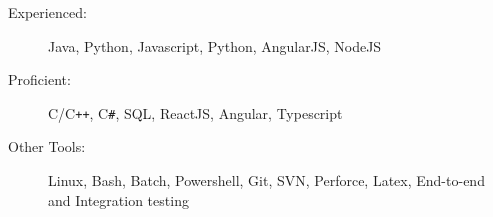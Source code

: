 

\begin{description}
\item[Experienced:]
Java, Python, Javascript, Python, AngularJS, NodeJS
\item[Proficient:]
C/C{}\verb!++!, C{}\verb!#!, SQL, ReactJS, Angular, Typescript
\item[Other Tools:]
Linux, Bash, Batch, Powershell, Git, SVN, Perforce, Latex, End-to-end and Integration testing
\end{description}
